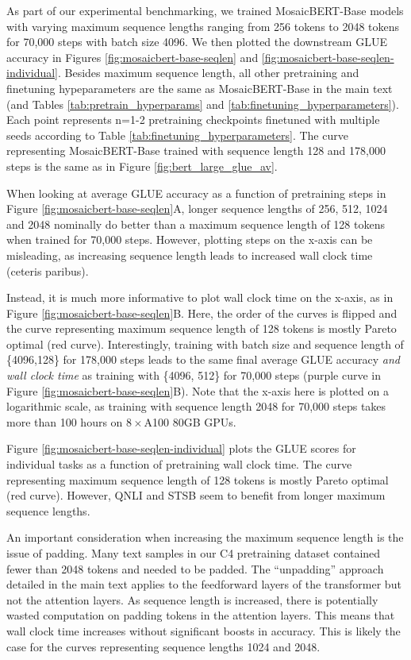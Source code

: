 As part of our experimental benchmarking, we trained MosaicBERT-Base models with varying maximum sequence lengths ranging from 256 tokens to 2048 tokens for 70,000 steps with batch size 4096. We then plotted the downstream GLUE accuracy in Figures \ref{fig:mosaicbert-base-seqlen} and \ref{fig:mosaicbert-base-seqlen-individual}. Besides maximum sequence length, all other pretraining and finetuning hypeparameters are the same as MosaicBERT-Base in the main text (and Tables \ref{tab:pretrain_hyperparams} and \ref{tab:finetuning_hyperparameters}). Each point represents n=1-2 pretraining checkpoints finetuned with multiple seeds according to Table \ref{tab:finetuning_hyperparameters}. The curve representing MosaicBERT-Base trained with sequence length 128 and 178,000 steps is the same as in Figure \ref{fig:bert_large_glue_av}.

When looking at average GLUE accuracy as a function of pretraining steps in Figure \ref{fig:mosaicbert-base-seqlen}A, longer sequence lengths of 256, 512, 1024 and 2048 nominally do better than a maximum sequence length of 128 tokens when trained for 70,000 steps. However, plotting steps on the x-axis can be misleading, as increasing sequence length leads to increased wall clock time (ceteris paribus).

Instead, it is much more informative to plot wall clock time on the x-axis, as in Figure \ref{fig:mosaicbert-base-seqlen}B. Here, the order of the curves is flipped and the curve representing maximum sequence length of 128 tokens is mostly Pareto optimal (red curve). Interestingly, training with batch size and sequence length of \{4096,128\} for 178,000 steps leads to the same final average GLUE accuracy \textit{and wall clock time} as training with \{4096, 512\} for 70,000 steps (purple curve in Figure \ref{fig:mosaicbert-base-seqlen}B). Note that the x-axis here is plotted on a logarithmic scale, as training with sequence length 2048 for 70,000 steps takes more than 100 hours on $8\times$A100 80GB GPUs.

Figure \ref{fig:mosaicbert-base-seqlen-individual} plots the GLUE scores for individual tasks as a function of pretraining wall clock time. The curve representing maximum sequence length of 128 tokens is mostly Pareto optimal (red curve). However, QNLI and STSB seem to benefit from longer maximum sequence lengths.

An important consideration when increasing the maximum sequence length is the issue of padding. Many text samples in our C4 pretraining dataset contained fewer than 2048 tokens and needed to be padded. The ``unpadding'' approach detailed in the main text applies to the feedforward layers of the transformer but not the attention layers. As sequence length is increased, there is potentially wasted computation on padding tokens in the attention layers. This means that wall clock time increases without significant boosts in accuracy. This is likely the case for the curves representing sequence lengths 1024 and 2048. 


